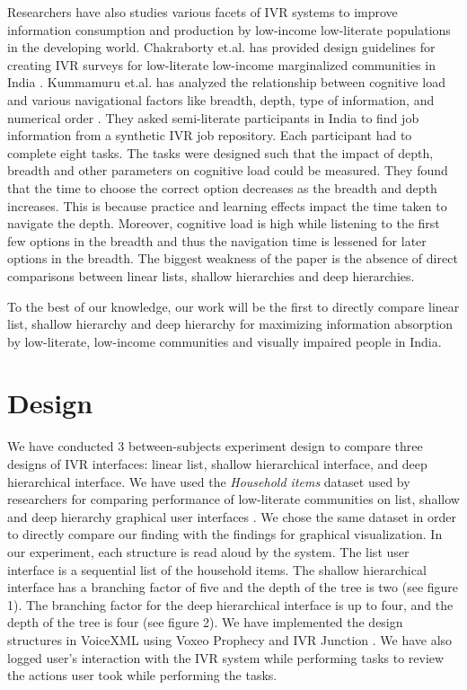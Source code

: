 \documentclass{sigchi}
\begin{document}
Researchers have also studies various facets of IVR systems to improve information consumption and production by low-income low-literate populations in the developing world. Chakraborty et.al. has provided design guidelines for creating IVR surveys for low-literate low-income marginalized communities in India \cite{Chakraborty2013}. Kummamuru et.al. has analyzed the relationship between cognitive load and various navigational factors like breadth, depth, type of information, and numerical order \cite{Kummamuru2012}. They asked semi-literate participants in India to find job information from a synthetic IVR job repository. Each participant had to complete eight tasks. The tasks were designed such that the impact of depth, breadth and other parameters on cognitive load could be measured. They found that the time to choose the correct option decreases as the breadth and depth increases. This is because practice and learning effects impact the time taken to navigate the depth. Moreover, cognitive load is high while listening to the first few options in the breadth and thus the navigation time is lessened for later options in the breadth. The biggest weakness of the paper is the absence of direct comparisons between linear lists, shallow hierarchies and deep hierarchies.

To the best of our knowledge, our work will be the first to directly compare linear list, shallow hierarchy and deep hierarchy for maximizing information absorption by low-literate, low-income communities and visually impaired people in India. 

\section{Design}
We have conducted 3 between-subjects experiment design to compare three designs of IVR interfaces: linear list, shallow hierarchical interface, and deep hierarchical interface. We have used the \textit{Household items} dataset used by researchers for comparing performance of low-literate communities on list, shallow and deep hierarchy graphical user interfaces \cite{Medhi2013a,Medhi2013b}. We chose the same dataset in order to directly compare our finding with the findings for graphical visualization. In our experiment, each structure is read aloud by the system. The list user interface is a sequential list of the household items. The shallow hierarchical interface has a branching factor of five and the depth of the tree is two (see figure 1). The branching factor for the deep hierarchical interface is up to four, and the depth of the tree is four (see figure 2). We have implemented the design structures in VoiceXML using Voxeo Prophecy and IVR Junction \cite{Vashistha}. We have also logged user's interaction with the IVR system while performing tasks to review the actions user took while performing the tasks.
\end{document}
